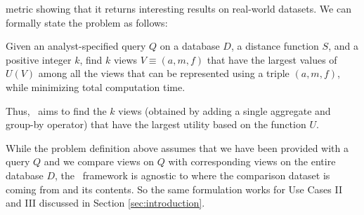 metric showing that it returns interesting results on real-world datasets.
We can formally state the \VizRecDB problem as follows:
\begin{problem}
\vspace{-5pt}
Given an analyst-specified query $Q$ on a database $D$, a distance function $S$,
and a positive integer $k$, find $k$ views $V \equiv (a, m, f)$ that
have the largest values of $U(V)$ among all the views that can be represented
using a triple $(a, m, f)$, while minimizing total computation time.
\vspace{-5pt}
\end{problem}
Thus, \VizRecDB\ aims to find the $k$ views (obtained by adding a single aggregate
 and group-by operator) that have the largest utility based on the function $U$.

While the problem definition above assumes that we have been provided with a
query $Q$ and we compare views on $Q$ with corresponding views on the entire
database $D$, the \VizRecDB\ framework is agnostic to where the comparison
dataset is coming from and its contents. So the same formulation works for Use
Cases II and III discussed in Section \ref{sec:introduction}. 





